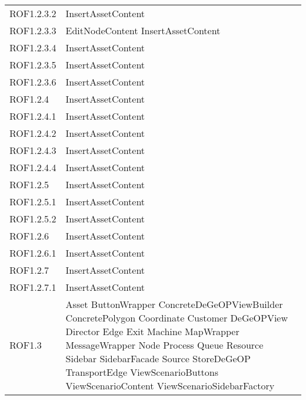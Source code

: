 \begin{longtable}{p{2.5cm}!{\VRule[1pt]}p{5cm}}
		ROF1.2.3.2 & InsertAssetContent\\
		ROF1.2.3.3 & EditNodeContent \newline InsertAssetContent\\
		ROF1.2.3.4 & InsertAssetContent\\
		ROF1.2.3.5 & InsertAssetContent\\
		ROF1.2.3.6 & InsertAssetContent\\
		ROF1.2.4 & InsertAssetContent\\
		ROF1.2.4.1 & InsertAssetContent\\
		ROF1.2.4.2 & InsertAssetContent\\
		ROF1.2.4.3 & InsertAssetContent\\
		ROF1.2.4.4 & InsertAssetContent\\
		ROF1.2.5 & InsertAssetContent\\
		ROF1.2.5.1 & InsertAssetContent\\
		ROF1.2.5.2 & InsertAssetContent\\
		ROF1.2.6 & InsertAssetContent\\
		ROF1.2.6.1 & InsertAssetContent\\
		ROF1.2.7 & InsertAssetContent\\
		ROF1.2.7.1 & InsertAssetContent\\
		ROF1.3 & Asset \newline ButtonWrapper \newline ConcreteDeGeOPViewBuilder \newline ConcretePolygon \newline Coordinate \newline Customer \newline DeGeOPView \newline Director \newline Edge \newline Exit \newline Machine \newline MapWrapper \newline MessageWrapper \newline Node \newline Process \newline Queue \newline Resource \newline Sidebar \newline SidebarFacade \newline Source \newline StoreDeGeOP \newline TransportEdge \newline ViewScenarioButtons \newline ViewScenarioContent \newline ViewScenarioSidebarFactory\\

\end{longtable}
